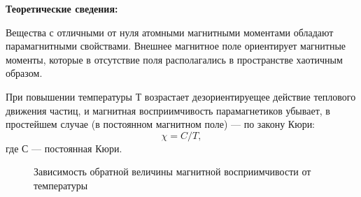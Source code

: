 \documentclass[a4paper,12pt]{article}
\begin{document}
\par \textbf{Теоретические сведения:}
\par Вещества с отличными от нуля атомными магнитными моментами обладают парамагнитными свойствами. Внешнее магнитное поле ориентирует магнитные моменты, которые в отсутствие поля располагались в пространстве хаотичным образом.
\par При повышении температуры Т возрастает дезориентируещее действие теплового движения частиц, и магнитная восприимчивость парамагнетиков убывает, в простейшем случае (в постоянном магнитном поле) — по закону Кюри:
\begin{equation}
\chi = C/T,
\end{equation} где С — постоянная Кюри.

\begin{figure}
	\centering
	\caption{Зависимость обратной величины магнитной восприимчивости от температуры}
	\label{mah}
\end{figure}
\end{document}
